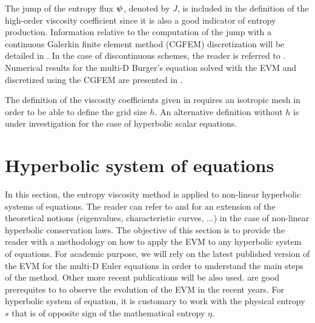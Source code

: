 %
The jump of the entropy flux $\boldsymbol\psi$, denoted by $J$, is included in the definition of the high-order viscosity coefficient since it is also a good indicator of entropy production. Information relative to the computation of the jump with a continuous Galerkin finite element method (CGFEM) discretization will be detailed in . In the case of discontinuous schemes, the reader is referred to \cite{valentin}. Numerical results for the multi-D Burger's equation solved with the EVM  and discretized using the CGFEM are presented in .
%
\begin{remark}
The definition of the viscosity coefficients given in  requires an isotropic mesh in order to be able to define the grid size $h$. An alternative definition without $h$ is under investigation for the case of hyperbolic scalar equations.
\end{remark}
%
\section{Hyperbolic system of equations}\label{sec:hyp_sect1b}
%
In this section, the entropy viscosity method is applied to non-linear hyperbolic systems of equations. The reader can refer to \cite{Toro} and \cite{Leveque} for an extension of the theoretical notions (eigenvalues, characteristic curves, $\ldots$) in the case of non-linear hyperbolic conservation laws. The objective of this section is to provide the reader with a methodology on how to apply the EVM to any hyperbolic system of equations. For academic purpose, we will rely on the latest published version of the EVM \cite{valentin} for the multi-D Euler equations in order to understand the main steps of the method. Other more recent publications will be also used. \cite{jlg, jlg2} are good prerequites to \cite{valentin} to observe the evolution of the EVM in the recent years. For hyperbolic system of equation, it is customary to work with the physical entropy $s$ that is of opposite sign of the mathematical entropy $\eta$.


